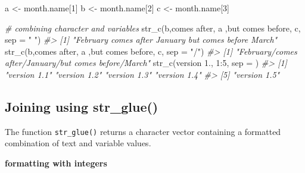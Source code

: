 \documentclass[
]{book}
\newenvironment{Shaded}{\begin{snugshade}}{\end{snugshade}}
\newcommand{\AttributeTok}[1]{\textcolor[rgb]{0.77,0.63,0.00}{#1}}
\newcommand{\CommentTok}[1]{\textcolor[rgb]{0.56,0.35,0.01}{\textit{#1}}}
\newcommand{\DecValTok}[1]{\textcolor[rgb]{0.00,0.00,0.81}{#1}}
\newcommand{\FunctionTok}[1]{\textcolor[rgb]{0.00,0.00,0.00}{#1}}
\newcommand{\NormalTok}[1]{#1}
\newcommand{\OtherTok}[1]{\textcolor[rgb]{0.56,0.35,0.01}{#1}}
\newcommand{\SpecialCharTok}[1]{\textcolor[rgb]{0.00,0.00,0.00}{#1}}
\newcommand{\StringTok}[1]{\textcolor[rgb]{0.31,0.60,0.02}{#1}}
\begin{document}
\begin{Shaded}
\begin{Highlighting}[]
\NormalTok{a }\OtherTok{\textless{}{-}}\NormalTok{ month.name[}\DecValTok{1}\NormalTok{]}
\NormalTok{b }\OtherTok{\textless{}{-}}\NormalTok{ month.name[}\DecValTok{2}\NormalTok{]}
\NormalTok{c }\OtherTok{\textless{}{-}}\NormalTok{ month.name[}\DecValTok{3}\NormalTok{]}

\CommentTok{\# combining character and variables}
\FunctionTok{str\_c}\NormalTok{(b,}\StringTok{\textquotesingle{}comes after\textquotesingle{}}\NormalTok{, a ,}\StringTok{\textquotesingle{}but comes before\textquotesingle{}}\NormalTok{, c, }\AttributeTok{sep =} \StringTok{" "}\NormalTok{)}
\CommentTok{\#\textgreater{} [1] "February comes after January but comes before March"}
\FunctionTok{str\_c}\NormalTok{(b,}\StringTok{\textquotesingle{}comes after\textquotesingle{}}\NormalTok{, a ,}\StringTok{\textquotesingle{}but comes before\textquotesingle{}}\NormalTok{, c, }\AttributeTok{sep =} \StringTok{"/"}\NormalTok{)}
\CommentTok{\#\textgreater{} [1] "February/comes after/January/but comes before/March"}
\FunctionTok{str\_c}\NormalTok{(}\StringTok{\textquotesingle{}version 1.\textquotesingle{}}\NormalTok{, }\DecValTok{1}\SpecialCharTok{:}\DecValTok{5}\NormalTok{, }\AttributeTok{sep =} \StringTok{\textquotesingle{}\textquotesingle{}}\NormalTok{)}
\CommentTok{\#\textgreater{} [1] "version 1.1" "version 1.2" "version 1.3" "version 1.4"}
\CommentTok{\#\textgreater{} [5] "version 1.5"}
\end{Highlighting}
\end{Shaded}

\hypertarget{joining-using-str_glue}{%
\subsection{Joining using str\_glue()}\label{joining-using-str_glue}}

The function \texttt{str\_glue()} returns a character vector containing a formatted combination of text and variable values.

\textbf{formatting with integers}
\end{document}
